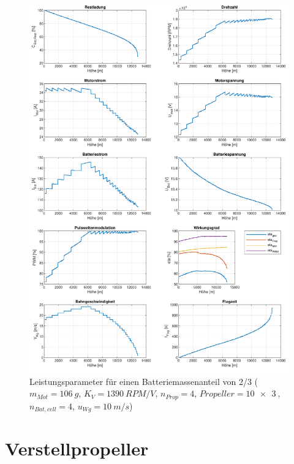 \begin{appendix}
\begin{figure}[H]
\centering
	\includegraphics[scale=0.7]{Diagramme/Einfluss_eta_ges2.pdf}
	\caption{Leistungsparameter für einen Batteriemassenanteil von 2/3 (\ensuremath{m_{Mot}=\SI{106}{g}}, \ensuremath{K_V=\SI{1390}{RPM/V}}, \ensuremath{n_{Prop}=4}, \ensuremath{Propeller=\SI{10x3}{}}, \ensuremath{n_{Bat,cell}=4}, \ensuremath{u_{Wg}=\SI{10}{m/s}})}
	\label{abb:m_bat_eta_ges2/3}
\end{figure}




\section{Verstellpropeller}


\end{appendix}
